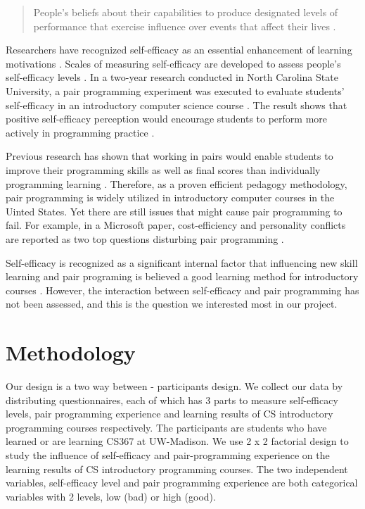 \documentclass{sigchi}
\begin{document}
\begin{quote}
People's beliefs about their capabilities to produce designated levels of performance that exercise influence over events that affect their lives \cite{bandura1997self}. 
\end{quote}

Researchers have recognized self-efficacy as an essential enhancement of learning motivations \cite{zimmerman2000self}. Scales of measuring self-efficacy are developed to assess people's self-efficacy levels \cite{sherer1982self}. In a two-year research conducted in North Carolina State University, a pair programming experiment was executed to evaluate students' self-efficacy in an introductory computer science course \cite{williams2001support}. The result shows that positive self-efficacy perception would encourage students to perform more actively in programming practice \cite{kinnunen2011cs}. 

Previous research has shown that working in pairs would enable students to improve their programming skills as well as final scores than individually programming learning \cite{williams2000all,mcdowell2002effects,mcdowell2003impact}. Therefore, as a proven efficient pedagogy methodology, pair programming is widely utilized in introductory computer courses in the Uinted States. Yet there are still issues that might cause pair programming to fail. For example, in a Microsoft paper, cost-efficiency and personality conflicts are reported as two top questions disturbing pair programming \cite{begel2008pair}.

Self-efficacy is recognized as a significant internal factor that influencing new skill learning \cite{schumacher2013developing} and pair programing is believed a good learning method for introductory courses \cite{mcdowell2002effects,de2016pair}. However, the interaction between self-efficacy and pair programming has not been assessed, and this is the question we interested most in our project.


\section{Methodology}
Our design is a two way between - participants design. We collect our data by distributing questionnaires, each of which has 3 parts to measure self-efficacy levels, pair programming experience and learning results of CS introductory programming courses respectively. The participants are students who have learned or are learning CS367 at UW-Madison. We use 2 x 2 factorial design to study the influence of self-efficacy and pair-programming experience on the learning results of CS introductory programming courses. The two independent variables, self-efficacy level and pair programming experience are both categorical variables with 2 levels, low (bad) or high (good). 
\end{document}
